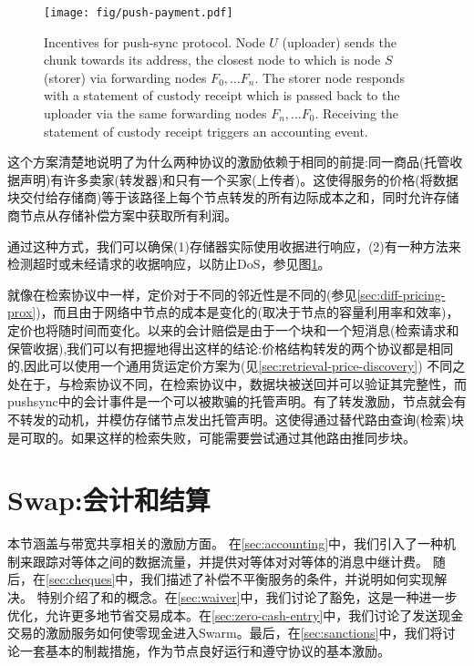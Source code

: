 \begin{figure}[htbp]
\centering
\texttt{[image: fig/push-payment.pdf]}
\caption[Incentives for push-sync protocol \statusgreen]{Incentives for push-sync protocol. Node $U$ (uploader) sends the chunk towards its address, the closest node to which is node $S$ (storer) via forwarding nodes $F_0, \ldots F_n$. The storer node responds with a statement of custody receipt which is passed back to the uploader via the same forwarding nodes $F_n, \ldots F_0$. Receiving the statement of custody receipt triggers an accounting event.}
\label{fig:syncing-swap}
\end{figure}

这个方案清楚地说明了为什么两种协议的激励依赖于相同的前提:同一商品(托管收据声明)有许多卖家(转发器)和只有一个买家(上传者)。这使得服务的价格(将数据块交付给存储商)等于该路径上每个节点转发的所有边际成本之和，同时允许存储商节点从存储补偿方案中获取所有利润。

通过这种方式，我们可以确保(1)存储器实际使用收据进行响应，(2)有一种方法来检测超时或未经请求的收据响应，以防止DoS，参见图\ref{fig:syncing-swap}。

就像在检索协议中一样，定价对于不同的邻近性是不同的(参见\ref{sec:diff-pricing-prox})，而且由于网络中节点的成本是变化的(取决于节点的容量利用率和效率)，定价也将随时间而变化。以来的会计赔偿是由于一个块和一个短消息(检索请求和保管收据),我们可以有把握地得出这样的结论:价格结构转发的两个协议都是相同的,因此可以使用一个通用货运定价方案为(见\ref{sec:retrieval-price-discovery}) 
不同之处在于，与检索协议不同，在检索协议中，数据块被送回并可以验证其完整性，而pushsync中的会计事件是一个可以被欺骗的托管声明。有了转发激励，节点就会有不转发的动机，并模仿存储节点发出托管声明。这使得通过替代路由查询(检索)块是可取的。如果这样的检索失败，可能需要尝试通过其他路由推同步块。 
 

\section{Swap:会计和结算}\label{sec:accounting-and-settlement}

\green{}

本节涵盖与带宽共享相关的激励方面。 
在\ref{sec:accounting}中，我们引入了一种机制来跟踪对等体之间的数据流量，并提供对等体对对等体的消息中继计费。
随后，在\ref{sec:cheques}中，我们描述了补偿不平衡服务的条件，并说明如何实现解决。
特别介绍了和的概念。在\ref{sec:waiver}中，我们讨论了豁免，这是一种进一步优化，允许更多地节省交易成本。在\ref{sec:zero-cash-entry}中，我们讨论了发送现金交易的激励服务如何使零现金进入Swarm。最后，在\ref{sec:sanctions}中，我们将讨论一套基本的制裁措施，作为节点良好运行和遵守协议的基本激励。

